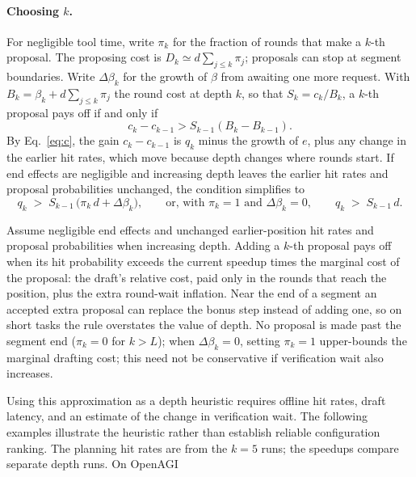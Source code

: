 \paragraph{Choosing $k$.}
For negligible tool time, write $\pi_k$ for the fraction of rounds that make a $k$-th proposal.
The proposing cost is $D_k\simeq d\sum_{j\le k}\pi_j$; proposals can stop at segment boundaries.
Write $\Delta\beta_k$ for the growth of
$\beta$ from awaiting one more request. With $B_k = \beta_k + d \sum_{j \le k} \pi_j$ the round cost at
depth $k$, so that $S_k = c_k / B_k$, a $k$-th proposal pays off if and only if
\begin{equation}
 c_k-c_{k-1}>S_{k-1}(B_k-B_{k-1}).
 \label{eq:main:depth}
\end{equation}
By Eq.~\ref{eq:c}, the gain $c_k - c_{k-1}$ is $q_k$ minus the
growth of $e$, plus any change in the earlier hit rates, which move because depth changes where rounds
start. If end effects are negligible and increasing depth leaves the earlier hit rates and proposal probabilities unchanged, the condition simplifies to
\begin{equation}
  q_k \;>\; S_{k-1}\,\bigl(\pi_k\, d + \Delta\beta_k\bigr),
  \qquad\text{or, with } \pi_k = 1 \text{ and } \Delta\beta_k = 0,\qquad
  q_k \;>\; S_{k-1}\, d .
  \label{eq:k}
\end{equation}
\begin{corollary}
\label{cor:k}
Assume negligible end effects and unchanged earlier-position hit rates and proposal probabilities when increasing depth. Adding a $k$-th proposal pays off when its hit probability exceeds the
current speedup times the marginal cost of the proposal: the draft's relative
cost, paid only in the rounds that reach the position, plus the extra round-wait
inflation. Near the end of a segment an accepted extra proposal can replace the bonus step instead of
adding one, so on short tasks the rule overstates the value of depth. No proposal is made past the segment
end ($\pi_k = 0$ for $k > L$); when $\Delta\beta_k=0$, setting $\pi_k=1$ upper-bounds the marginal drafting cost; this need not be conservative if verification wait also increases.
\end{corollary}
Using this approximation as a depth heuristic requires offline hit rates, draft latency, and an estimate of the change in verification wait. The following examples illustrate the heuristic rather than establish reliable configuration ranking. The planning hit rates are from the $k=5$ runs; the speedups compare separate depth runs. On OpenAGI
